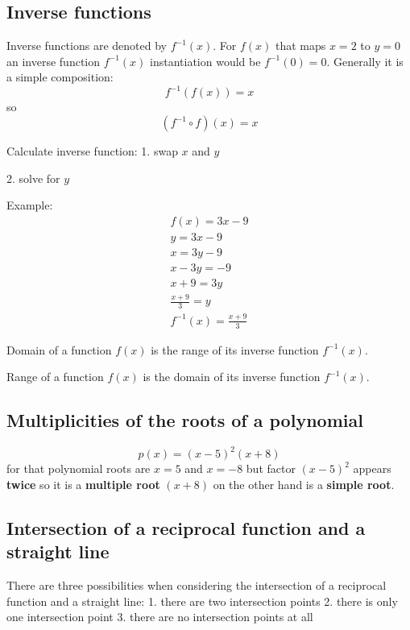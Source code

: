 \documentclass{article}
\begin{document}
\subsection{Inverse functions}
Inverse functions are denoted by $f^{-1}(x)$.
For $f(x)$ that maps $x=2$ to $y=0$ an inverse function $f^{-1}(x)$ instantiation would be
$f^{-1}(0)=0$.
Generally it is a simple composition:
\begin{equation}
  f^{-1}(f(x)) = x
\end{equation}
so
\begin{equation}
  (f^{-1} \circ f)(x) = x
\end{equation}


Calculate inverse function:
1. swap $x$ and $y$

2. solve for $y$

Example:
\begin{equation}
  \begin{gathered}
    f(x) = 3x-9 \\
    y = 3x-9 \\
    x = 3y-9 \\
    x-3y=-9 \\
    x+9=3y \\
    \frac{x+9}{3}=y \\
    f^{-1}(x)=\frac{x+9}{3}
  \end{gathered}
\end{equation}

Domain of a function $f(x)$ is the range of its inverse function $f^{-1}(x)$.

Range of a function $f(x)$ is the domain of its inverse function $f^{-1}(x)$.

\subsection{Multiplicities of the roots of a polynomial}
\begin{equation}
  p(x) = (x-5)^2(x+8)
\end{equation}
for that polynomial roots are $x=5$ and $x=-8$ but factor $(x-5)^2$
appears \textbf{twice} so it is a \textbf{multiple root}
$(x+8)$ on the other hand is a \textbf{simple root}.

\subsection{Intersection of a reciprocal function and a straight line}
There are three possibilities when considering the intersection of a reciprocal
function and a straight line:
1. there are two intersection points
2. there is only one intersection point
3. there are no intersection points at all
\end{document}
